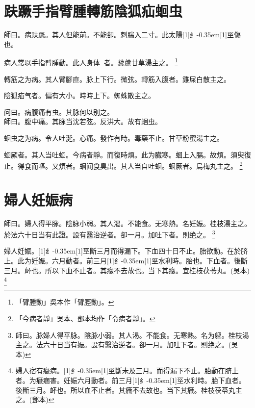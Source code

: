 \documentclass[11pt,oneside,b5paper]{ctexbook}
\begin{document}
\begin{flushleft}
\chapter{趺蹶手指臂腫轉筋陰狐疝蛔虫}

師曰。病趺蹶。其人但能前。不能卻。刺腨入二寸。此太陽{\hbox{\scalebox{0.68}[1]{纟}\kern-0.35em\scalebox{0.64}[1]{巠}}}傷也。

病人常以手指臂腫動。此人身体{𥆧}{𥆧}者。藜蘆甘草湯主之。
\footnote{「臂腫動」吳本作「臂脛動」。}

轉筋之为病。其人臂腳直。脉上下行。微弦。轉筋入腹者。雞屎白散主之。

陰狐疝气者。偏有大小。時時上下。蜘蛛散主之。

问曰。病腹痛有虫。其脉何以别之。\\
師曰。腹中痛。其脉当沈若弦。反洪大。故有蛔虫。

蛔虫之为病。令人吐涎。心痛。發作有時。毒藥不止。甘草粉蜜湯主之。

蛔厥者。其人当吐蛔。今病者靜。而復時煩。此为臓寒。蛔上入膈。故煩。須臾復止。得食而嘔。又煩者。蛔闻食臭出。其人当自吐蛔。蛔厥者。烏梅丸主之。
\footnote{「今病者靜」吳本、鄧本均作「令病者靜」。}

\chapter{婦人妊娠病}

師曰。婦人得平脉。陰脉小弱。其人渴。不能食。无寒熱。名妊娠。桂枝湯主之。於法六十日当有此證。設有醫治逆者。卻一月。加吐下者。則绝之。
\footnote{師曰。脉婦人得平脉。陰脉小弱。其人渴。不能食。无寒熱。名为軀。桂枝湯主之。法六十日当有娠。設有醫治逆者。卻一月。加吐下者。則绝之。(吳本)}

婦人妊娠。{\hbox{\scalebox{0.68}[1]{纟}\kern-0.35em\scalebox{0.64}[1]{巠}}}斷三月而得漏下。下血四十日不止。胎欲動。在於脐上。此为妊娠。六月動者。前三月{\hbox{\scalebox{0.68}[1]{纟}\kern-0.35em\scalebox{0.64}[1]{巠}}}水利時。胎也。下血者。後斷三月。衃也。所以下血不止者。其癥不去故也。当下其癥。宜桂枝茯苓丸。(吳本)
\footnote{婦人宿有癥病。{\hbox{\scalebox{0.68}[1]{纟}\kern-0.35em\scalebox{0.64}[1]{巠}}}斷未及三月。而得漏下不止。胎動在脐上者。为癥痼害。妊娠六月動者。前三月{\hbox{\scalebox{0.68}[1]{纟}\kern-0.35em\scalebox{0.64}[1]{巠}}}水利時。胎下血者。後斷三月。衃也。所以血不止者。其癥不去故也。当下其癥。桂枝茯苓丸主之。(鄧本)}


\end{flushleft}
\end{document}
